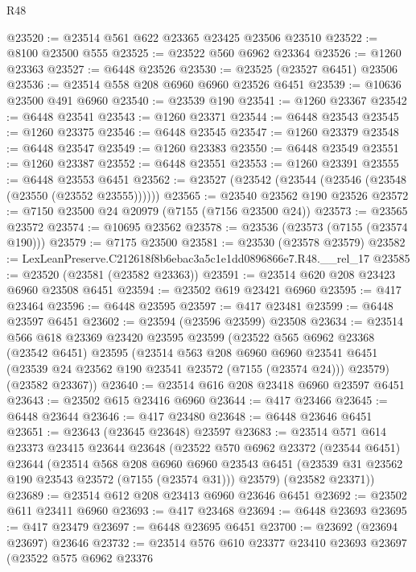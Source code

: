 \begin{lexlean}{R48}
\begin{coremodule}
@23520 := @23514 @561 @622 @23365 @23425 @23506 @23510
@23522 := @8100 @23500 @555
@23525 := @23522 @560 @6962 @23364
@23526 := @1260 @23363
@23527 := @6448 @23526
@23530 := @23525 (@23527 @6451) @23506
@23536 := @23514 @558 @208 @6960 @6960 @23526 @6451
@23539 := @10636 @23500 @491 @6960
@23540 := @23539 @190
@23541 := @1260 @23367
@23542 := @6448 @23541
@23543 := @1260 @23371
@23544 := @6448 @23543
@23545 := @1260 @23375
@23546 := @6448 @23545
@23547 := @1260 @23379
@23548 := @6448 @23547
@23549 := @1260 @23383
@23550 := @6448 @23549
@23551 := @1260 @23387
@23552 := @6448 @23551
@23553 := @1260 @23391
@23555 := @6448 @23553 @6451
@23562 := @23527 (@23542 (@23544 (@23546 (@23548 (@23550 (@23552 @23555))))))
@23565 := @23540 @23562 @190 @23526
@23572 := @7150 @23500 @24 @20979 (@7155 (@7156 @23500 @24))
@23573 := @23565 @23572
@23574 := @10695 @23562
@23578 := @23536 (@23573 (@7155 (@23574 @190)))
@23579 := @7175 @23500
@23581 := @23530 (@23578 @23579)
@23582 := LexLeanPreserve.C212618f8b6ebac3a5c1e1dd0896866e7.R48.__rel_17
@23585 := @23520 (@23581 (@23582 @23363))
@23591 := @23514 @620 @208 @23423 @6960 @23508 @6451
@23594 := @23502 @619 @23421 @6960
@23595 := @417 @23464
@23596 := @6448 @23595
@23597 := @417 @23481
@23599 := @6448 @23597 @6451
@23602 := @23594 (@23596 @23599) @23508
@23634 := @23514
    @566
    @618
    @23369
    @23420
    @23595
    @23599
    (@23522
      @565
      @6962
      @23368
      (@23542 @6451)
      @23595
      (@23514
        @563
        @208
        @6960
        @6960
        @23541
        @6451
        (@23539 @24 @23562 @190 @23541 @23572 (@7155 (@23574 @24)))
        @23579)
      (@23582 @23367))
@23640 := @23514 @616 @208 @23418 @6960 @23597 @6451
@23643 := @23502 @615 @23416 @6960
@23644 := @417 @23466
@23645 := @6448 @23644
@23646 := @417 @23480
@23648 := @6448 @23646 @6451
@23651 := @23643 (@23645 @23648) @23597
@23683 := @23514
    @571
    @614
    @23373
    @23415
    @23644
    @23648
    (@23522
      @570
      @6962
      @23372
      (@23544 @6451)
      @23644
      (@23514
        @568
        @208
        @6960
        @6960
        @23543
        @6451
        (@23539 @31 @23562 @190 @23543 @23572 (@7155 (@23574 @31)))
        @23579)
      (@23582 @23371))
@23689 := @23514 @612 @208 @23413 @6960 @23646 @6451
@23692 := @23502 @611 @23411 @6960
@23693 := @417 @23468
@23694 := @6448 @23693
@23695 := @417 @23479
@23697 := @6448 @23695 @6451
@23700 := @23692 (@23694 @23697) @23646
@23732 := @23514
    @576
    @610
    @23377
    @23410
    @23693
    @23697
    (@23522
      @575
      @6962
      @23376

\end{coremodule}
\end{lexlean}
